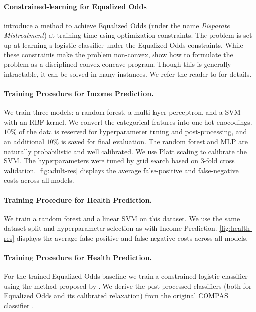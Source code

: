 \paragraph{Constrained-learning for Equalized Odds}
\citet{zafar2017fairness} introduce a method to achieve Equalized Odds
(under the name \emph{Disparate Mistreatment}) at training time using
optimization constraints. The problem is set up at learning a logistic
classifier under the Equalized Odds constraints. While these constraints
make the problem non-convex, \citeauthor{zafar2017fairness} show how
to formulate the problem as a disciplined convex-concave program.
Though this is generally intractable, it can be solved in many instances.
We refer the reader to \cite{zafar2017fairness} for details.

\paragraph{Training Procedure for Income Prediction.}
We train three models: a random forest, a multi-layer perceptron, and a SVM
with an RBF kernel. We convert the categorical features into one-hot enocodings.
$10\%$ of the data is reserved for hyperparameter tuning and
post-processing, and an additional $10\%$ is saved for final evaluation.
The random forest and MLP are naturally probabilistic and well calibrated.
We use Platt scaling to calibrate the SVM.
The hyperparameters were tuned by grid search based on 3-fold cross validation.
\autoref{fig:adult-res} displays the average false-positive and false-negative
costs across all models.

\paragraph{Training Procedure for Health Prediction.}
We train  a random forest and a linear SVM on this dataset. We use the
same dataset split and hyperparameter selection as with Income Prediction.
\autoref{fig:health-res} displays the average false-positive and false-negative
costs across all models.

\paragraph{Training Procedure for Health Prediction.}
For the trained Equalized Odds baseline we train a constrained
logistic classifier using the method proposed by \cite{zafar2017fairness}.
We derive the post-processed
classifiers (both for Equalized Odds and its calibrated relaxation) from the
original COMPAS classifier \cite{dieterich-northpointe-fairness}.
